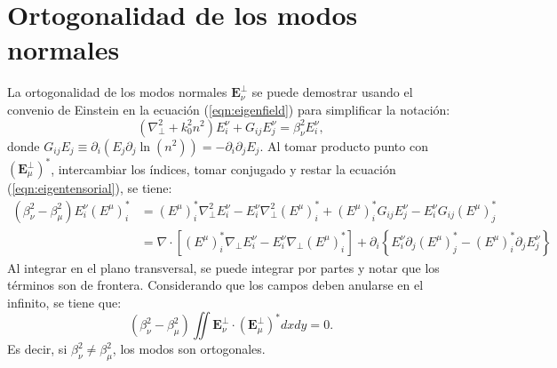 \chapter{Ortogonalidad de los modos normales \label{sec:orto}}

La ortogonalidad de los modos normales $\textbf{E}_\nu^\perp$ se puede demostrar usando el convenio de Einstein en la ecuación (\ref{eqn:eigenfield}) para simplificar la notación:
\begin{equation}
	\left(\nabla_\perp^2 + k_0^2n^2\right) E^\nu_i + G_{ij} E^\nu_j = \beta_\nu^2 E^\nu_i, \label{eqn:eigentensorial}
\end{equation}
donde $G_{ij}E_j \equiv \partial_i \left(E_j  \partial_j\ln(n^2) \right) = -\partial_i \partial_j E_j  $. Al tomar producto punto con $\left(\textbf{E}_\mu^\perp\right)^*$, intercambiar los índices, tomar conjugado y restar la ecuación (\ref{eqn:eigentensorial}), se tiene:
\begin{align*}
	(\beta_\nu^2-\beta_\mu^2)E^\nu_i \left(E^\mu\right)^*_i &=  \left(E^\mu\right)^*_i \nabla_\perp^2 E^\nu_i - E^\nu_i \nabla_\perp^2 \left(E^\mu\right)^*_i  + \left(E^\mu\right)^*_i G_{ij} E^\nu_j - E^\nu_i G_{ij} \left(E^\mu\right)^*_j
	\\
	&= \nabla \cdot \left[ \left(E^\mu\right)^*_i \nabla_\perp E^\nu_i - E^\nu_i \nabla_\perp \left(E^\mu\right)^*_i \right] + \partial_i \left\{ E_i^\nu \partial_j \left(E^\mu\right)^*_j - \left(E^\mu\right)^*_i \partial_j E_j^\nu  \right\}
\end{align*}
Al integrar en el plano transversal, se puede integrar por partes y notar que los términos son de frontera. Considerando que los campos deben anularse en el infinito, se tiene que:
\begin{equation}
	(\beta_\nu^2-\beta_\mu^2)\iint \textbf{E}^\perp_\nu \cdot \left(\textbf{E}^\perp_\mu\right)^* dx dy = 0.
\end{equation}
Es decir, si $\beta_\nu^2 \neq \beta_\mu^2$, los modos son ortogonales.